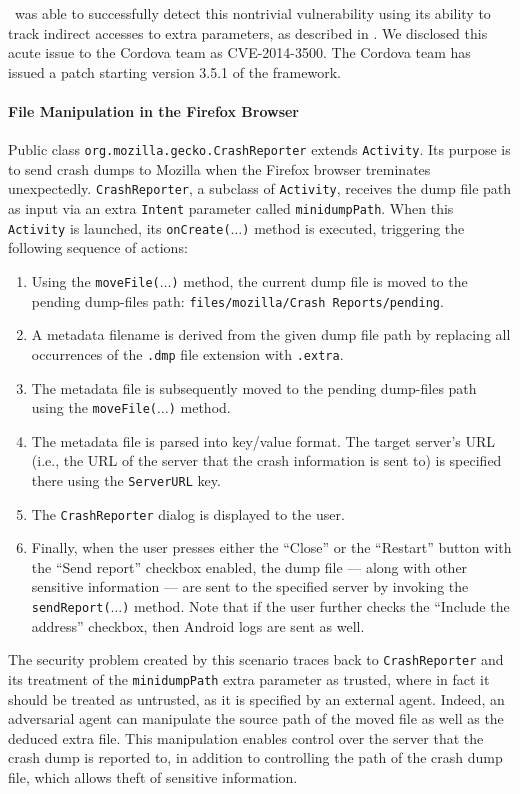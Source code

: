 \Tool\ was able to successfully detect this nontrivial vulnerability using its ability to track indirect accesses to extra parameters, as described in .
We  disclosed this acute issue to the Cordova team as CVE-2014-3500. The Cordova team has issued a patch starting version 3.5.1 of the framework.

\paragraph{File Manipulation in the Firefox Browser}\label{Se:FirefoxFileManipulation}

Public class {\tt org.mozilla.gecko.CrashReporter} extends {\tt Activity}. Its purpose is to send crash dumps to Mozilla when the Firefox browser treminates unexpectedly.
{\tt CrashReporter}, a subclass of {\tt Activity}, receives the dump file path as input via an extra {\tt Intent} parameter called {\tt minidumpPath}. When this {\tt Activity} is launched, its {\tt onCreate($\ldots$)} method is executed, triggering the following sequence of actions:
\begin{enumerate}
	\item Using the \texttt{moveFile($\ldots$)} method, the current dump file is moved to the pending dump-files path: \texttt{files/mozilla/Crash Reports/pending}.
	\item A metadata filename is derived from the given dump file path by replacing all occurrences of the {\tt .dmp} file extension with  {\tt .extra}. 
	\item The metadata file is subsequently moved to the pending dump-files path using the \texttt{moveFile($\ldots$)} method.
	\item The metadata file is parsed into key/value format. The target server's URL (i.e., the URL of the server that the crash information is sent to) is specified there using the \texttt{ServerURL} key.
	\item The {\tt CrashReporter} dialog is displayed to the user.
	\item Finally, when the user presses either the ``Close'' or the ``Restart'' button with the ``Send report'' checkbox enabled, the dump file --- along with other sensitive information --- are sent to the specified server by invoking the {\tt sendReport($\ldots$)} method. Note that if the user further checks the ``Include the address'' checkbox, then Android logs are sent as well.
\end{enumerate}

The security problem created by this scenario traces back to {\tt CrashReporter} and its treatment of the {\tt minidumpPath} extra parameter as trusted, where in fact it should be treated as untrusted, as it is specified by an external agent.
%
Indeed, an adversarial agent can manipulate the source path of the moved file as well as the deduced extra file. 
This manipulation enables control over the server that the crash dump is reported to, in addition to controlling the path of the crash dump file, which allows theft of sensitive information.

